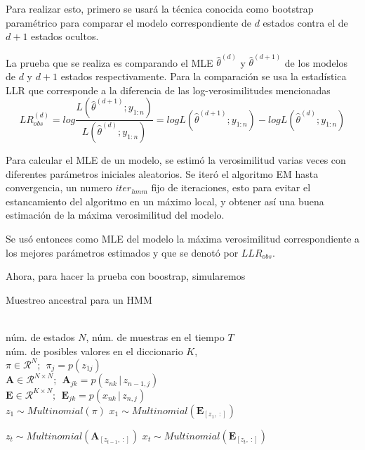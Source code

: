 Para realizar esto, primero se usará la técnica conocida como bootstrap paramétrico para comparar el modelo correspondiente de $d$ estados contra el de $d+1$ estados ocultos.

La prueba que se realiza es comparando el \ac{MLE} $\hat \theta^{(d)}$ y $\hat \theta^{(d+1)}$ de los modelos de $d$ y $d+1$ estados respectivamente. Para la comparación se usa la estadística \ac{LLR} que corresponde a la diferencia de las log-verosimilitudes mencionadas
\begin{equation}
  LR^{(d)}_{obs} = log \frac{L(\hat \theta^{(d+1)}; y_{1:n})}{L(\hat \theta^{(d)}; y_{1:n})} =
    log L(\hat \theta^{(d+1)}; y_{1:n}) - 
    log L(\hat \theta^{(d)}; y_{1:n})
\end{equation}

Para calcular el \ac{MLE} de un modelo, se estimó la verosimilitud varias veces con diferentes parámetros iniciales aleatorios. Se iteró el algoritmo \ac{EM} hasta convergencia, un numero $iter_{hmm}$ fijo de iteraciones, esto para evitar el estancamiento del algoritmo en un máximo local, y obtener así una buena estimación de la máxima verosimilitud del modelo.

Se usó entonces como \ac{MLE} del modelo la máxima verosimilitud correspondiente a los mejores parámetros estimados y que se denotó por $LLR_{obs}$.

Ahora, para hacer la prueba con boostrap, simularemos 

\begin{algorithm}[tp]
   \caption{Muestreo ancestral para un HMM}
   \label{alg:ancsamp}
\begin{algorithmic}
    \\
   núm. de estados $N$, núm. de muestras en el tiempo $T$ \\
   núm. de posibles valores en el diccionario $K$, \\
   $ \pi \in \mathcal{R}^{N}; ~~ \pi_j = p(z_{1j})$ \\
   $ \mathbf{A} \in \mathcal{R}^{N \times N}; ~~
   \mathbf{A}_{jk} = p(z_{nk} \,|\, z_{n-1, j})$ \\

   $ \mathbf{E} \in \mathcal{R}^{K \times N}; ~~
   \mathbf{E}_{jk} = p(x_{nk} \,|\, z_{n, j})$\\  
   \STATE
   \STATE $z_1 \sim Multinomial(\pi)$   
   \STATE $x_1 \sim Multinomial(\mathbf{E}_{[z_1,~:]})$

    \STATE $z_t \sim Multinomial(\mathbf{A}_{[z_{t-1},~:]})$ 
    \STATE $x_t \sim Multinomial(\mathbf{E}_{[z_t,~:]})$
   \ENDFOR   
\end{algorithmic}
\end{algorithm}


